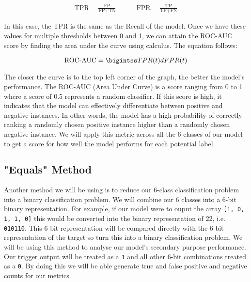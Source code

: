 \begin{equation}
    \begin{gathered}
        \text{TPR} = \frac{\text{FP}}{\text{FP} + \text{TN}}
        \quad \quad \quad
        \text{FPR} = \frac{\text{TP}}{\text{TP} + \text{FN}}
    \end{gathered}
\end{equation}

In this case, the TPR is the same as the Recall of the model. Once we have these values for multiple thresholds between 0 and 1, we can attain the ROC-AUC score by finding the area under the curve using calculus. The equation follows:

\begin{equation}
    \begin{gathered}
        $$\text{ROC-AUC} = \bigintss TPR(t) dFPR(t)$$
    \end{gathered}
\end{equation}

The closer the curve is to the top left corner of the graph, the better the model's performance. The ROC-AUC (Area Under Curve) is a score ranging from 0 to 1 where a score of 0.5 represents a random classifier. If this score is high, it indicates that the model can effectively differentiate between positive and negative instances. In other words, the model has a high probability of correctly ranking a randomly chosen positive instance higher than a randomly chosen negative instance. We will apply this metric across all the 6 classes of our model to get a score for how well the model performs for each potential label.

\subsection{"Equals" Method}

Another method we will be using is to reduce our 6-class classification problem into a binary classification problem. We will combine our 6 classes into a 6-bit binary representation. For example, if our model were to ouput the array \verb|[1, 0, 1, 1, 0]| this would be converted into the binary representation of 22, i.e. \verb|010110|. This 6 bit representation will be compared directly with the 6 bit representation of the target so turn this into a binary classification problem. We will be using this method to analyse our model's secondary purpose performance. Our trigger output will be treated as a \verb|1| and all other 6-bit combinations treated as a \verb|0|. By doing this we will be able generate true and false positive and negative counts for our metrics.

